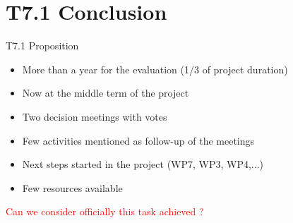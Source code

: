 
\section{T7.1 Conclusion}


\begin{frame}{T7.1 Proposition}



\begin{itemize}
\item More than a year for the evaluation (1/3 of project duration)
\item Now at the middle term of the project
\item Two decision meetings with votes
\item Few activities mentioned as follow-up of the meetings
\item Next steps started in the project (WP7, WP3, WP4,...)
\item Few resources available
\end{itemize}

  \pause
  \textcolor{red}{Can we consider officially this task achieved ?}

\end{frame}

